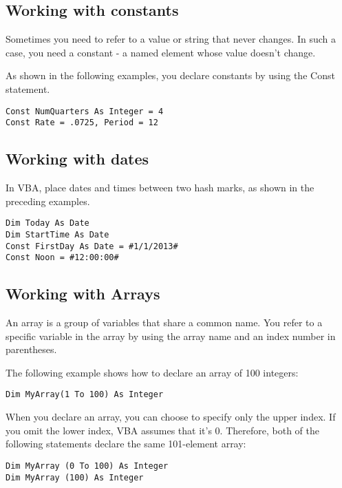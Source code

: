 \documentclass[
]{article}
\theoremstyle{definition}
\theoremstyle{definition}
\theoremstyle{definition}
\theoremstyle{definition}
\theoremstyle{remark}
\begin{document}
\hypertarget{working-with-constants}{%
\subsection{Working with constants}\label{working-with-constants}}

Sometimes you need to refer to a value or string that never changes. In such a case, you need a constant - a named element whose value doesn't change.

As shown in the following examples, you declare constants by using the
Const statement.

\begin{verbatim}
Const NumQuarters As Integer = 4
Const Rate = .0725, Period = 12
\end{verbatim}

\hypertarget{working-with-dates}{%
\subsection{Working with dates}\label{working-with-dates}}

In VBA, place dates and times between two hash marks, as shown in the
preceding examples.

\begin{verbatim}
Dim Today As Date
Dim StartTime As Date
Const FirstDay As Date = #1/1/2013#
Const Noon = #12:00:00#
\end{verbatim}

\hypertarget{working-with-arrays}{%
\subsection{Working with Arrays}\label{working-with-arrays}}

An array is a group of variables that share a common name. You refer to
a specific variable in the array by using the array name and an index
number in parentheses.

The following example shows how to declare an array of 100 integers:

\begin{verbatim}
Dim MyArray(1 To 100) As Integer
\end{verbatim}

When you declare an array, you can choose to specify only the upper
index. If you omit the lower index, VBA assumes that it's 0.
Therefore, both of the following statements declare the same 101-element
array:

\begin{verbatim}
Dim MyArray (0 To 100) As Integer
Dim MyArray (100) As Integer
\end{verbatim}
\end{document}
